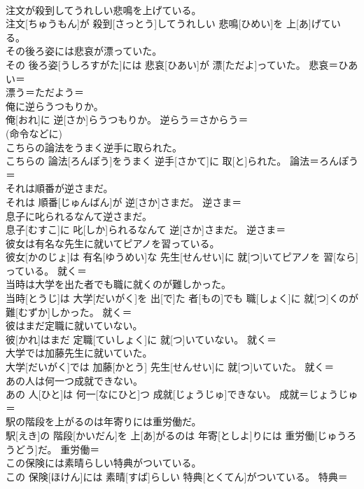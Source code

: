 \documentclass[8pt]{extreport}
\begin{document}
\begin{CJK}{UTF8}{min}
\\	注文が殺到してうれしい悲鳴を上げている。	
\\	注文[ちゅうもん]が 殺到[さっとう]してうれしい 悲鳴[ひめい]を 上[あ]げている。	
\\	その後ろ姿には悲哀が漂っていた。	
\\	その 後ろ姿[うしろすがた]には 悲哀[ひあい]が 漂[ただよ]っていた。	悲哀＝ひあい＝ 
\\	漂う＝ただよう＝ 
\\	俺に逆らうつもりか。	
\\	俺[おれ]に 逆[さか]らうつもりか。	逆らう＝さからう＝ 
\\	(命令などに) 
\\	こちらの論法をうまく逆手に取られた。	
\\	こちらの 論法[ろんぽう]をうまく 逆手[さかて]に 取[と]られた。	論法＝ろんぽう＝ 
\\	それは順番が逆さまだ。	
\\	それは 順番[じゅんばん]が 逆[さか]さまだ。	逆さま＝ 
\\	息子に叱られるなんて逆さまだ。	
\\	息子[むすこ]に 叱[しか]られるなんて 逆[さか]さまだ。	逆さま＝ 
\\	彼女は有名な先生に就いてピアノを習っている。	
\\	彼女[かのじょ]は 有名[ゆうめい]な 先生[せんせい]に 就[つ]いてピアノを 習[なら]っている。	就く＝ 
\\	当時は大学を出た者でも職に就くのが難しかった。	
\\	当時[とうじ]は 大学[だいがく]を 出[で]た 者[もの]でも 職[しょく]に 就[つ]くのが 難[むずか]しかった。	就く＝ 
\\	彼はまだ定職に就いていない。	
\\	彼[かれ]はまだ 定職[ていしょく]に 就[つ]いていない。	就く＝ 
\\	大学では加藤先生に就いていた。	
\\	大学[だいがく]では 加藤[かとう] 先生[せんせい]に 就[つ]いていた。	就く＝ 
\\	あの人は何一つ成就できない。	
\\	あの 人[ひと]は 何一[なにひと]つ 成就[じょうじゅ]できない。	成就＝じょうじゅ＝ 
\\	駅の階段を上がるのは年寄りには重労働だ。	
\\	駅[えき]の 階段[かいだん]を 上[あ]がるのは 年寄[としよ]りには 重労働[じゅうろうどう]だ。	重労働＝ 
\\	この保険には素晴らしい特典がついている。	
\\	この 保険[ほけん]には 素晴[すば]らしい 特典[とくてん]がついている。	特典＝ 

\end{CJK}
\end{document}
